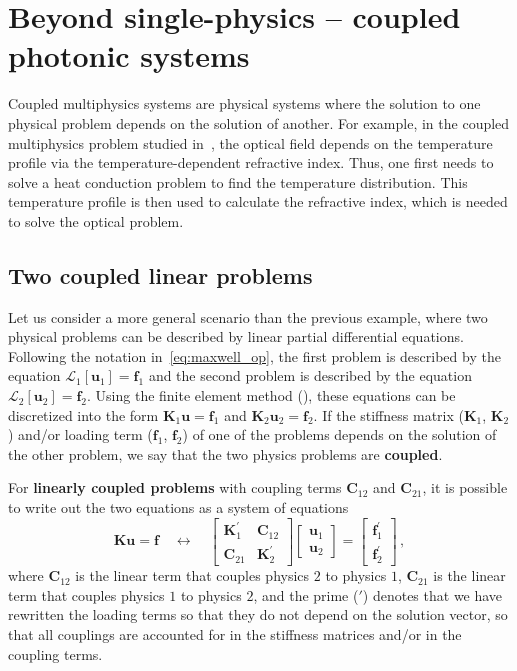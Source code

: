  \section{Beyond single-physics -- coupled photonic systems}\label{sec:coupled}

 Coupled multiphysics systems are physical systems where the solution to one physical 
 problem depends on the solution of another. For example, in the coupled multiphysics 
 problem studied in~\cite{ownpub0}, the optical field depends on the temperature profile via
 the temperature-dependent refractive index. Thus, one first needs to solve a heat conduction problem to find the temperature distribution. 
 This temperature profile is then used to calculate the refractive index, which is needed to solve the optical problem.
    \subsection*{Two coupled linear problems}
 Let us consider a more general scenario than the previous example, where two physical
 problems can be described by linear partial differential equations. Following the notation in~\eqref{eq:maxwell_op}, the
 first problem
 is described by the equation $\mathcal{L}_1 [\mathbf{u}_1]= \mathbf{f}_1$ and
 the second problem is described by the
 equation $\mathcal{L}_2 [\mathbf{u}_2]= \mathbf{f}_2$. Using the finite element method (), these equations can be
 discretized into the form $\mathbf{K}_1 \mathbf{u} = \mathbf{f}_1$ and $\mathbf{K}_2 \mathbf{u}_2 =
\mathbf{f}_2$.
 If the stiffness matrix ($\mathbf{K}_1$, $\mathbf{K}_2$) and/or loading term ($\mathbf{f}_1$, $\mathbf{f}_2$) of one of the problems depends on the solution of the
 other problem, we say that the two physics problems are
    \textbf{coupled}. 
    
    For \textbf{linearly coupled problems} with coupling terms $\mathbf{C}_{12}$ and $\mathbf{C}_{21}$, it is possible to write out the two equations as a system of equations
    \begin{equation}\label{eq:c_N_2}
 \mathbf{K} \mathbf{u} = \mathbf{f} \quad \longleftrightarrow \quad 
        \begin{bmatrix}
 \mathbf{K}^\prime_1  & \mathbf{C}_{12} \\
 \mathbf{C}_{21} & \mathbf{K}^\prime_2
        \end{bmatrix}
        \begin{bmatrix}
 \mathbf{u}_1 \\
 \mathbf{u}_2
        \end{bmatrix}
 =
        \begin{bmatrix}
 \mathbf{f}_1^\prime \\
 \mathbf{f}_2^\prime
        \end{bmatrix}\,,
    \end{equation}
 where $\mathbf{C}_{12}$ is the linear term that couples physics $2$ to physics $1$,
$\mathbf{C}_{21}$ is the linear term that couples physics $1$ to physics $2$, and the
 prime ($\prime$) denotes that we have rewritten the loading terms so that they do not
 depend on the solution vector, so that all couplings are
 accounted for in the stiffness matrices and/or in the coupling terms. 
 
